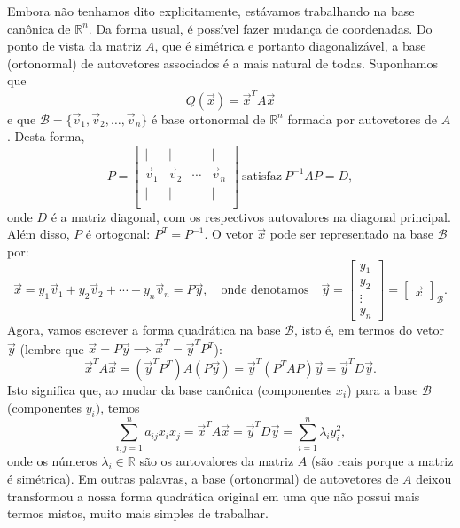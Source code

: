 \documentclass[../livro.tex]{subfiles}
\begin{document}
Embora não tenhamos dito explicitamente, estávamos trabalhando na base canônica de $\mathbb{R}^n$. Da forma usual, é possível fazer mudança de coordenadas. Do ponto de vista da matriz $A$, que é simétrica e portanto diagonalizável, a base (ortonormal) de autovetores associados é a mais natural de todas. Suponhamos que 
\begin{equation}
Q(\vec{x}) = \vec{x}^T A \vec{x}
\end{equation} e que $\mathcal{B} = \{ \vec{v}_1, \vec{v}_2, \dots, \vec{v}_n\}$ é base ortonormal de $\mathbb{R}^n$ formada por autovetores de $A$. Desta forma,
\begin{equation}
P = 
\begin{bmatrix}
| & | &   & |  \\
\vec{v}_1 & \vec{v}_2 & \cdots & \vec{v}_n \\
| & | &   & |  \\
\end{bmatrix} \ \text{satisfaz} \ P^{-1}AP = D,
\end{equation} onde $D$ é a matriz diagonal, com os respectivos autovalores na diagonal principal. Além disso, $P$ é ortogonal: $P^T = P^{-1}$. O vetor $\vec{x}$ pode ser representado na base $\mathcal{B}$ por:
\begin{equation}
\vec{x} = y_1 \vec{v}_1 + y_2 \vec{v}_2 + \cdots + y_n \vec{v}_n = P\vec{y}, \quad \text{onde denotamos} \quad \vec{y} = 
\begin{bmatrix}
y_1 \\ y_2 \\ \vdots \\ y_n
\end{bmatrix} = 
\begin{bmatrix}
\vec{x}
\end{bmatrix}_{\mathcal{B}}.
\end{equation} Agora, vamos escrever a forma quadrática na base $\mathcal{B}$, isto é, em termos do vetor $\vec{y}$ (lembre que $\vec{x} = P \vec{y} \implies \vec{x}^T = \vec{y}^T P^T$):
\begin{equation}
\vec{x}^T A \vec{x} = (\vec{y}^T P^T) A (P \vec{y}) = \vec{y}^T (P^T A P) \vec{y} = \vec{y}^T D \vec{y}.
\end{equation} Isto significa que, ao mudar da base canônica (componentes $x_i$) para a base $\mathcal{B}$ (componentes $y_i$), temos
\begin{equation}
\sum_{i,j=1}^{n} a_{ij} x_i x_j = \vec{x}^T A \vec{x} = \vec{y}^T D \vec{y} = \sum_{i=1}^{n} \lambda_i y_i^2,
\end{equation} onde os números $\lambda_i \in \mathbb{R}$ são os autovalores da matriz $A$ (são reais porque a matriz é simétrica). Em outras palavras, a base (ortonormal) de autovetores de $A$ deixou transformou a nossa forma quadrática original em uma que não possui mais termos mistos, muito mais simples de trabalhar.
\end{document}
